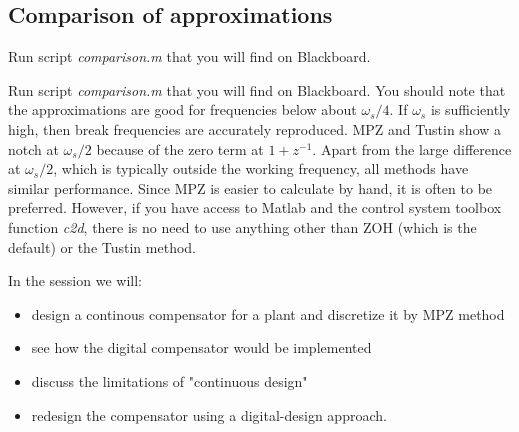 \subsection*{Comparison of approximations}

\ifslidesonly
\begin{slide}
Run script \emph{comparison.m} that you will find on Blackboard.
\end{slide}
\fi
Run script \emph{comparison.m} that you will find on Blackboard.
You should note that the approximations are good for frequencies below about $\omega_s/4$.
If $\omega_s$ is sufficiently high, then break frequencies are accurately reproduced.
MPZ and Tustin show a notch at $\omega_s/2$ because of the zero term at $1+z^{-1}$.
Apart from the large difference at $\omega_s/2$, which is typically outside the
working frequency, all methods have similar performance. Since MPZ is easier to
calculate by hand, it is often to be preferred. However, if you have access to
Matlab and the control system toolbox function \emph{c2d}, there is no need to
use anything other than ZOH (which is the default) or the Tustin method.

\ifslidesonly
\begin{slide}
In the session we will:
\begin{itemize}
\item design a continous compensator for a plant and discretize it by MPZ method
\item see how the digital compensator would be implemented
\item discuss the limitations of "continuous design"
\item redesign the compensator using a digital-design approach.
\end{itemize}
\end{slide}
\fi

\begin{slide}
	\label{slides:ex1-1}
\end{slide}


